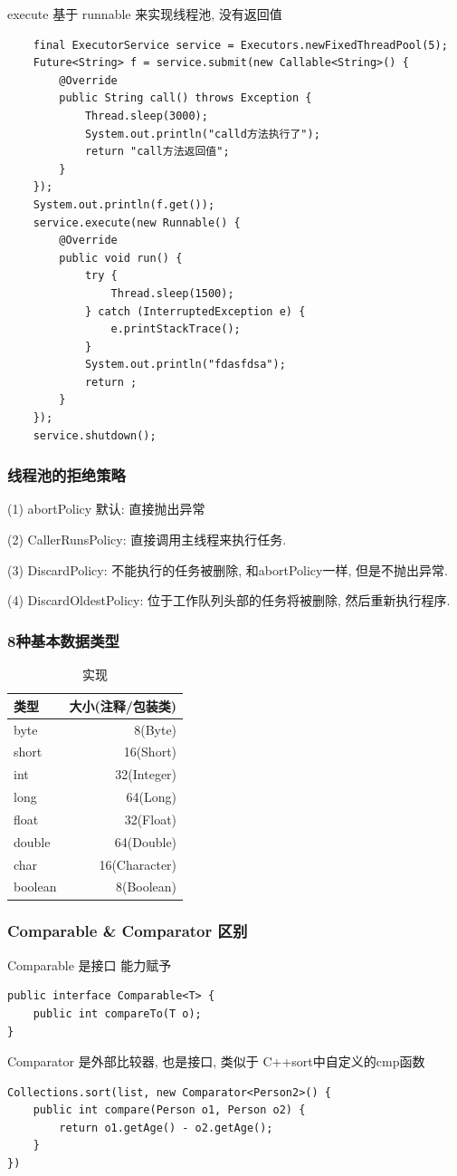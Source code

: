 execute 基于 runnable 来实现线程池, 没有返回值
\begin{lstlisting}
    final ExecutorService service = Executors.newFixedThreadPool(5);
	Future<String> f = service.submit(new Callable<String>() {
		@Override
		public String call() throws Exception {
			Thread.sleep(3000);
			System.out.println("calld方法执行了");
			return "call方法返回值";
		}
	});
	System.out.println(f.get());
	service.execute(new Runnable() {
		@Override
		public void run() {
			try {
				Thread.sleep(1500);
			} catch (InterruptedException e) {
				e.printStackTrace();
			}
			System.out.println("fdasfdsa");
			return ;
		}
	});
	service.shutdown();
\end{lstlisting}
\subsubsection{线程池的拒绝策略}
(1) abortPolicy 默认: 直接抛出异常 \par
(2) CallerRunsPolicy:  直接调用主线程来执行任务. \par
(3) DiscardPolicy: 不能执行的任务被删除, 和abortPolicy一样, 但是不抛出异常. \par
(4) DiscardOldestPolicy: 位于工作队列头部的任务将被删除, 然后重新执行程序. \par
\subsubsection{8种基本数据类型}
\begin{table}[!htbp]
	\centering
	\caption{实现}
	\begin{tabular}{|l|r|}

		\hline
		类型    & 大小(注释/包装类) \\
		\hline
		byte    & 8(Byte)           \\
		\hline
		short   & 16(Short)         \\
		\hline
		int     & 32(Integer)       \\
		\hline
		long    & 64(Long)          \\
		\hline
		float   & 32(Float)         \\
		\hline
		double  & 64(Double)        \\
		\hline
		char    & 16(Character)     \\
		\hline
		boolean & 8(Boolean)        \\
		\hline
	\end{tabular}
\end{table}
\subsubsection{Comparable \& Comparator 区别}
Comparable 是接口 能力赋予
\begin{lstlisting}
public interface Comparable<T> {
	public int compareTo(T o);
}
\end{lstlisting}
Comparator 是外部比较器, 也是接口, 类似于 C++sort中自定义的cmp函数
\begin{lstlisting}
Collections.sort(list, new Comparator<Person2>() {
	public int compare(Person o1, Person o2) {
		return o1.getAge() - o2.getAge();
	}
})
\end{lstlisting}
